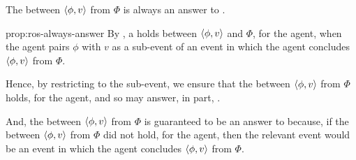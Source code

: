 \begin{note}
  \begin{proposition}
    \label{prop:ros-always-answer}

    The \ros{} between \(\langle \phi, v \rangle\) from \(\Phi\) is always an answer to \qWhyV{}.
  \end{proposition}

  \begin{argument}{prop:ros-always-answer}
    By \supportI{}, a \ros{} holds between \(\langle \phi, v \rangle\) and \(\Phi\), for the agent, when the agent pairs \(\phi\) with \(v\) as a sub-event of an event in which the agent concludes \(\langle \phi, v \rangle\) from \(\Phi\).

    Hence, by restricting \qWhyV{} to the sub-event, we ensure that the \ros{} between \(\langle \phi, v \rangle\) from \(\Phi\) holds, for the agent, and so may answer, in part, \qWhyV{}.

    And, the \ros{} between \(\langle \phi, v \rangle\) from \(\Phi\) is guaranteed to be an answer to \qWhyV{} because, if the \ros{} between \(\langle \phi, v \rangle\) from \(\Phi\) did not hold, for the agent, then the relevant event would be an event in which the agent concludes \(\langle \phi, v \rangle\) from \(\Phi\).
  \end{argument}
\end{note}

